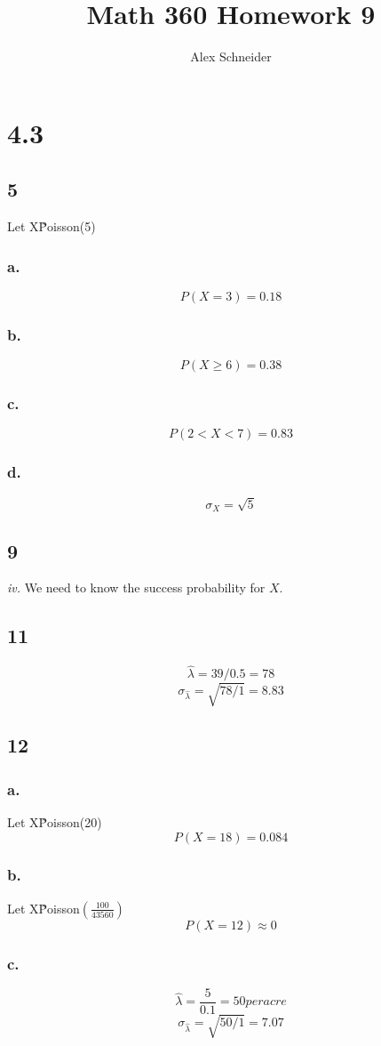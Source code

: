 \documentclass[11pt]{article}
\title{Math 360 Homework 9}
\author{Alex Schneider}
\begin{document}
\maketitle
\section*{4.3}
\subsection*{5}
Let X\~Poisson(5)
\subsubsection*{a.}
\[ P(X = 3) = 0.18 \]
\subsubsection*{b.}
\[ P(X \ge 6) = 0.38 \]
\subsubsection*{c.}
\[ P(2 < X < 7) = 0.83 \]
\subsubsection*{d.}
\[ \sigma_X = \sqrt{5} \]

\subsection*{9}
\textit{iv.} We need to know the success probability for $X$. 
\subsection*{11}
\[\hat{\lambda} = 39 / 0.5 = 78 \]
\[\sigma_{\hat{\lambda}} = \sqrt{78 / 1} = 8.83 \]
\subsection*{12}
\subsubsection*{a.}
Let X\~Poisson(20)
\[ P(X=18) = 0.084 \]
\subsubsection*{b.}
Let X\~Poisson$\left( \frac{100}{43560} \right)$
\[ P(X=12) \approx 0 \]
\subsubsection*{c.}
\[\hat{\lambda} = \frac{5}{0.1} = 50 per acre \]
\[\sigma_{\hat{\lambda}} = \sqrt{50 / 1} = 7.07 \]
\end{document}
